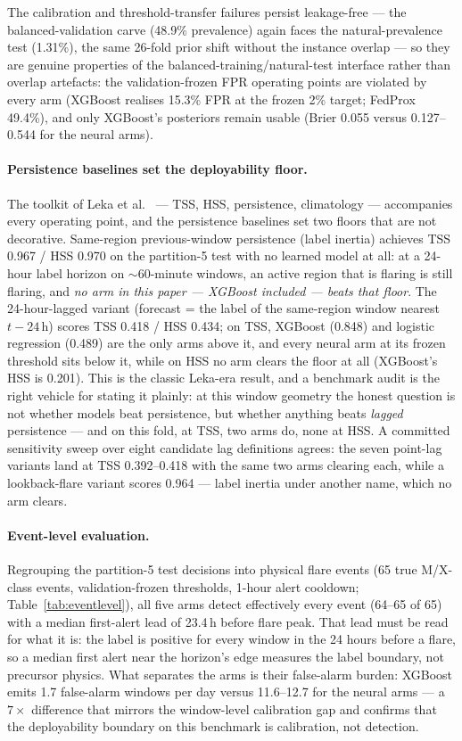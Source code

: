 The calibration and threshold-transfer failures persist
leakage-free --- the balanced-validation carve (48.9\% prevalence)
again faces the natural-prevalence test (1.31\%), the same 26-fold
prior shift without the instance overlap --- so they are genuine
properties of the balanced-training/natural-test interface rather
than overlap artefacts: the validation-frozen FPR operating points
are violated by every arm (XGBoost realises 15.3\% FPR at the frozen
2\% target; FedProx 49.4\%), and only XGBoost's posteriors remain
usable (Brier 0.055 versus 0.127--0.544 for the neural arms).

\paragraph{Persistence baselines set the deployability floor.}
The toolkit of Leka et al.~\cite{leka2019} --- TSS, HSS,
persistence, climatology --- accompanies every operating point, and
the persistence baselines set two floors that are not decorative.
Same-region previous-window persistence (label inertia) achieves
TSS 0.967 / HSS 0.970 on the partition-5 test with no learned model
at all: at a 24-hour label horizon on $\sim$60-minute windows, an
active region that is flaring is still flaring, and \emph{no arm in
this paper --- XGBoost included --- beats that floor}. The
24-hour-lagged variant (forecast = the label of the same-region
window nearest $t-24$\,h) scores TSS 0.418 / HSS 0.434; on TSS,
XGBoost (0.848) and logistic regression (0.489) are the only arms
above it, and every neural arm at its frozen threshold sits below
it, while on HSS no arm clears the floor at all (XGBoost's HSS is
0.201). This is the classic Leka-era result, and a benchmark audit
is the right vehicle for stating it plainly: at this window geometry
the honest question is not whether models beat persistence, but
whether anything beats \emph{lagged} persistence --- and on this
fold, at TSS, two arms do, none at HSS. A committed sensitivity sweep
over eight candidate lag definitions agrees: the seven point-lag
variants land at TSS 0.392--0.418 with the same two arms clearing
each, while a lookback-flare variant scores 0.964 --- label inertia
under another name, which no arm clears.

\paragraph{Event-level evaluation.}
Regrouping the partition-5 test decisions into physical flare events
(65 true M/X-class events, validation-frozen thresholds, 1-hour
alert cooldown; Table~\ref{tab:eventlevel}), all five arms detect
effectively every event (64--65 of 65) with a median first-alert
lead of 23.4\,h before flare peak. That lead must be read for what it
is: the label is positive for every window in the 24 hours before a
flare, so a median first alert near the horizon's edge measures the
label boundary, not precursor physics. What separates the arms is
their false-alarm burden: XGBoost emits 1.7 false-alarm windows per
day versus 11.6--12.7 for the neural arms --- a $7\times$ difference
that mirrors the window-level calibration gap and confirms that the
deployability boundary on this benchmark is calibration, not
detection.

